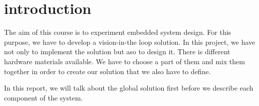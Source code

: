 \section{introduction}
The aim of this course is to experiment embedded system design. For this purpose, we have to develop a vision-in-the loop solution. In this project, we have not only to implement the solution but aso to design it. There is different hardware materials available. We have to choose a part of them and mix them together in order to create our solution that we also have to define.

In this report, we will  talk about the global solution first before we describe each component of the system.


